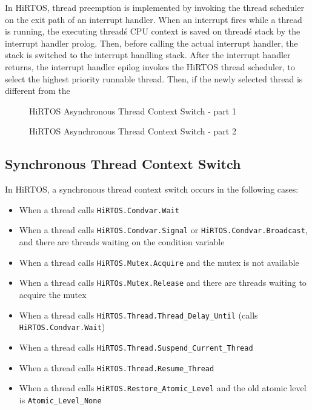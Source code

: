 \documentclass[11pt,letterpaper,twoside,openany]{book}
\begin{document}
In HiRTOS, thread preemption is implemented by invoking the thread scheduler
on the exit path of an interrupt handler. When an interrupt fires while
a thread is running, the executing thread\'s CPU context is saved
on thread\'s stack by the interrupt handler prolog. Then, before calling the
actual interrupt handler, the stack is switched to the interrupt handling stack.
After the interrupt handler returns, the interrupt handler epilog invokes
the HiRTOS thread scheduler, to select the highest priority runnable thread.
Then, if the newly selected thread is different from the

\begin{figure}[H]
   \centering
   \scalebox{0.40} {
      
   }
   \caption{HiRTOS Asynchronous Thread Context Switch - part 1}
   \label{HiRTOSumlSeqDiagram1}
\end{figure}

\begin{figure}[H]
   \centering
   \scalebox{0.40} {
      
   }
   \caption{HiRTOS Asynchronous Thread Context Switch - part 2}
   \label{HiRTOSumlSeqDiagram2}
\end{figure}

\subsection{Synchronous Thread Context Switch}

In HiRTOS, a synchronous thread context switch occurs in the following cases:
\begin{itemize}
\item When a thread calls \verb`HiRTOS.Condvar.Wait`
\item When a thread calls \verb`HiRTOS.Condvar.Signal` or \verb`HiRTOS.Condvar.Broadcast`,
      and there are threads waiting on the condition variable
\item When a thread calls \verb`HiRTOS.Mutex.Acquire` and the mutex is not available
\item When a thread calls \verb`HiRTOs.Mutex.Release` and there are threads waiting
      to acquire the mutex
\item When a thread calls \verb`HiRTOS.Thread.Thread_Delay_Until` (calls \verb`HiRTOS.Condvar.Wait`)
\item When a thread calls \verb`HiRTOS.Thread.Suspend_Current_Thread`
\item When a thread calls \verb`HiRTOS.Thread.Resume_Thread`
\item When a thread calls \verb`HiRTOS.Restore_Atomic_Level` and the old atomic level is
      \verb`Atomic_Level_None`
\end{itemize}
\end{document}
